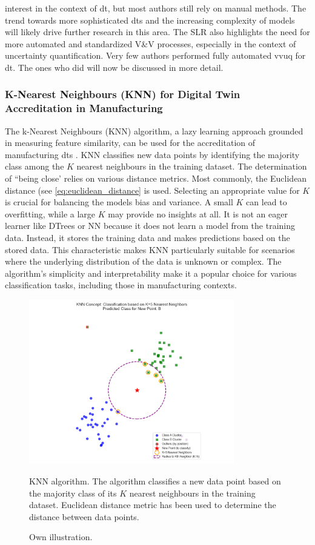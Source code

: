interest in the context of \gls{dt}, but most authors still rely on manual methods. The trend towards more sophisticated \gls{dt}s and the increasing complexity of models will likely drive further research in this area. The SLR also highlights the need for more automated and standardized V\&V processes, especially in the context of uncertainty quantification. Very few authors performed fully automated \gls{vvuq} for \gls{dt}. The ones who did will now be discussed in more detail.


\subsubsection*{K-Nearest Neighbours (KNN) for Digital Twin Accreditation in Manufacturing}
\label{sec:knn}
The k-Nearest Neighbours (KNN) algorithm, a lazy learning approach grounded in measuring feature similarity, can be used for the accreditation of manufacturing \gls{dt}s \autocite{dos2024simulation}. KNN classifies new data points by identifying the majority class among the $K$ nearest neighbours in the training dataset. The determination of ``being close' relies on various distance metrics. Most commonly, the Euclidean distance (see \autoref{eq:euclidean_distance} is used. Selecting an appropriate value for $K$ is crucial for balancing the models bias and variance. A small $K$ can lead to overfitting, while a large $K$ may provide no insights at all. It is not an eager learner like DTrees or NN because it does not learn a model from the training data. Instead, it stores the training data and makes predictions based on the stored data. This characteristic makes KNN particularly suitable for scenarios where the underlying distribution of the data is unknown or complex. The algorithm's simplicity and interpretability make it a popular choice for various classification tasks, including those in manufacturing contexts.

\begin{figure}[htbp]
  \centering
  \includegraphics[width=0.8\textwidth]{figures/knn.png}
  \caption[KNN Intuition]{KNN algorithm. The algorithm classifies a new data point based on the majority class of its $K$ nearest neighbours in the training dataset. Euclidean distance metric has been used to determine the distance between data points.}
  \label{fig:knn}
  \caption*{Own illustration.}
\end{figure}

